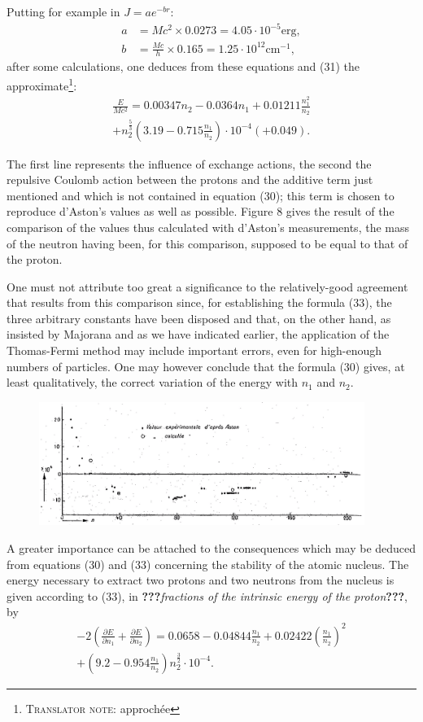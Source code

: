 \documentclass[a4paper,11pt]{article}
\newcommand{\WTF}[1]{\textbf{???}\textit{#1}\textbf{???}}
\newcommand{\?}[2]{#1\footnote{\textsc{Translator note}: #2}}
\newcommand{\nequ}[2]{\begin{align*}\tag{#1}#2\end{align*}}
\newcommand{\uequ}[1]{\begin{align*}#1\end{align*}}
\renewcommand{\exp}[1]{e^{#1}}
\newcommand{\pXpY}[2]{\frac{\partial #1}{\partial #2}}
\begin{document}
{{Putting for example in $J=a\exp{-br}$:
\uequ{
a &= Mc^2 \times 0.0273 = 4.05\cdot 10^{-5}\text{erg},\\
b &= \frac{Mc}{h} \times 0.165 = 1.25\cdot 10^{12} \text{cm}^{-1},
}
after some calculations, one deduces from these equations and (31) the \?{approximate}{approchée}:
\nequ{33}{
\frac{E}{Mc^2} = 0.00347n_2 - 0.0364n_1 + 0.01211 \frac{n_1^2}{n_2}\\
+ n_2^\frac{5}{3}\left(3.19 - 0.715\frac{n_1}{n_2}\right)\cdot 10^{-4}(+0.049).
}

The first line represents the influence of exchange actions, the second the repulsive Coulomb action between the protons and the additive term just mentioned and which is not contained in equation (30); this term is chosen to reproduce d'Aston's values as well as possible. Figure 8 gives the result of the comparison of the values thus calculated with d'Aston's measurements, the mass of the neutron having been, for this comparison, supposed to be equal to that of the proton.

One must not attribute too great a significance to the relatively-good agreement that results from this comparison since, for establishing the formula (33), the three arbitrary constants have been disposed and that, on the other hand, as insisted by Majorana and as we have indicated earlier, the application of the Thomas-Fermi method may include important errors, even for high-enough numbers of particles. One may however conclude that the formula (30) gives, at least qualitatively, the correct variation of the energy with $n_1$ and $n_2$.
\begin{figure}[h!]
\centering
\includegraphics[width=300pt]{images/Fig8}
\end{figure}
A greater importance can be attached to the consequences which may be deduced from equations (30) and (33) concerning the stability of the atomic nucleus. The energy necessary to extract two protons and two neutrons from the nucleus is given according to (33), in \WTF{fractions of the intrinsic energy of the proton}, by
\nequ{34}{
-2\left(\pXpY{E}{n_1} + \pXpY{E}{n_2}\right) = 0.0658 - 0.04844\frac{n_1}{n_2} + 0.02422\left(\frac{n_1}{n_2}\right)^2\\
+\left(9.2 - 0.954\frac{n_1}{n_2}\right)n_2^\frac{3}{2}\cdot 10^{-4}.
}

}}
\end{document}
